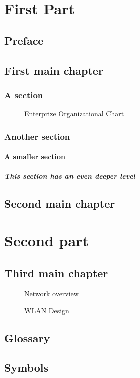 \documentclass{book}
\begin{document}
\tableofcontents
\listoffigures 
\part{First Part}
\chapter*{Preface}
\chapter{First main chapter}
\section{A section}
\begin{figure}
\centering
{}
\caption{Enterprize Organizational Chart}
\end{figure} 
\section{Another section}
\subsection{A smaller section}
\subsubsection[Deeper level]{This section has an even deeper level}
\chapter{Second main chapter}
\part{Second part}
\chapter{Third main chapter}
\begin{figure}
\centering
{}
\caption{Network overview}
\end{figure}
\begin{figure}
\centering
{}
\caption{WLAN Design}
\end{figure}
\appendix
\cleardoublepage
{}
\chapter{Glossary}
\chapter{Symbols}
\end{document}
